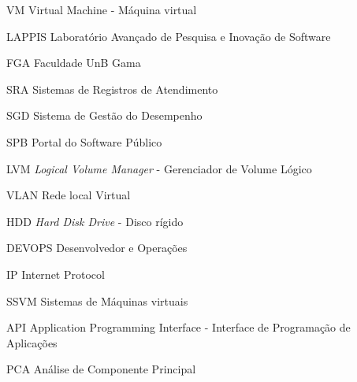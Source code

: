 \begin{siglas}
  \item[VM] Virtual Machine - Máquina virtual
  \item[LAPPIS] Laboratório Avançado de Pesquisa e Inovação de Software
  \item[FGA] Faculdade UnB Gama
  \item[SRA] Sistemas de Registros de Atendimento
  \item[SGD] Sistema de Gestão do Desempenho
  \item[SPB] Portal do Software Público
  \item[LVM] \textit{Logical Volume Manager} - Gerenciador de Volume Lógico
  \item[VLAN] Rede local Virtual
  \item[HDD] \textit{Hard Disk Drive} - Disco rígido
  \item[DEVOPS] Desenvolvedor e Operações
  \item[IP] Internet Protocol
  \item [SSVM] Sistemas de Máquinas virtuais
  \item [API] Application Programming Interface - Interface de Programação de Aplicações 
  \item [PCA] Análise de Componente Principal
\end{siglas}
